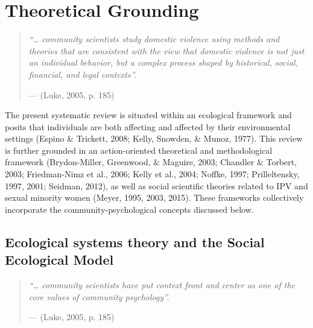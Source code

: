 \documentclass[11pt,]{tufte-book}
\begin{document}
\chapter{Theoretical Grounding}\label{theoretical-grounding}

\begin{quote}
\emph{``\ldots{} community scientists study domestic violence using
methods and theories that are consistent with the view that domestic
violence is not just an individual behavior, but a complex process
shaped by historical, social, financial, and legal contexts''.}

\hfill --- (Luke, 2005, p. 185)
\end{quote}

The present systematic review is situated within an ecological framework
and posits that individuals are both affecting and affected by their
environmental settings (Espino \& Trickett, 2008; Kelly, Snowden, \&
Munoz, 1977). This review is further grounded in an action-oriented
theoretical and methodological framework (Brydon-Miller, Greenwood, \&
Maguire, 2003; Chandler \& Torbert, 2003; Friedman-Nimz et al., 2006;
Kelly et al., 2004; Noffke, 1997; Prilleltensky, 1997, 2001; Seidman,
2012), as well as social scientific theories related to IPV and sexual
minority women (Meyer, 1995, 2003, 2015). These frameworks collectively
incorporate the community-psychological concepts discussed below.

\section{Ecological systems theory and the Social Ecological
Model}\label{ecological-systems-theory-and-the-social-ecological-model}

\begin{quote}
\emph{``\ldots{} community scientists have put context front and center
as one of the core values of community psychology''.}

\hfill --- (Luke, 2005, p. 185)
\end{quote}
\end{document}
